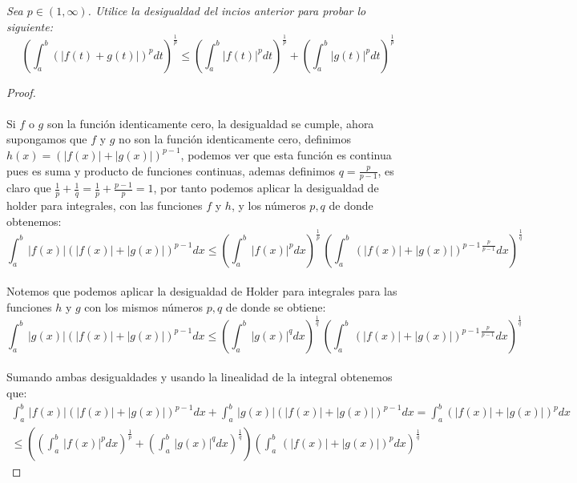 \documentclass[11pt,letterpaper]{article}
\begin{document}
\begin{tcolorbox}[
	title = \textcolor{black}{\textcolor{white}{Problema 2}},]
\textit{Sea $p\in (1,\infty)$. Utilice la desigualdad del incios anterior para probar lo siguiente:\,\\
\begin{equation*}
   \left(\int_{a}^{b}(|f(t)+g(t)|)^pdt\right)^{\frac{1}{p}}\leq\left(\int_{a}^{b}|f(t)|^pdt\right)^{\frac{1}{p}}+\left(\int_{a}^{b}|g(t)|^pdt\right)^{\frac{1}{p}} 
\end{equation*}
}
\end{tcolorbox}
\begin{proof}\,\\
	\,\\
	Si $f$ o $g$ son la funci\'on identicamente cero, la desigualdad se cumple, ahora supongamos que $f$ y $g$ no son la funci\'on identicamente cero, definimos $h(x)=(|f(x)|+|g(x)|)^{p-1}$, podemos ver que esta funci\'on es continua pues es suma y producto de funciones continuas, ademas definimos $q=\frac{p}{p-1}$, es claro que $\frac{1}{p}+\frac{1}{q}=\frac{1}{p}+\frac{p-1}{p}=1$, por tanto podemos aplicar la desigualdad
	de holder para integrales, con las funciones $f$ y $h$, y los n\'umeros $p,q$ de donde obtenemos:\,\\
	\begin{equation*}
		\int_{a}^{b}\,|f(x)|(|f(x)|+|g(x)|)^{p-1}dx\leq \left(\int_{a}^{b}\,|f(x)|^pdx\right)^{\frac{1}{p}}\,\left(\int_{a}^{b}\,(|f(x)|+|g(x)|)^{p-1\,\frac{p}{p-1}}dx\right)^{\frac{1}{q}}
	\end{equation*}\,\\
	Notemos que podemos aplicar la desigualdad de Holder para integrales para las funciones $h$ y $g$ con los mismos n\'umeros $p,q$ de donde se obtiene:\,\\
	\begin{equation*}
		\int_{a}^{b}\,|g(x)|(|f(x)|+|g(x)|)^{p-1}dx\leq \left(\int_{a}^{b}\,|g(x)|^qdx\right)^{\frac{1}{q}}\,\left(\int_{a}^{b}\,(|f(x)|+|g(x)|)^{p-1\,\frac{p}{p-1}}dx\right)^{\frac{1}{q}}
	\end{equation*}\,\\
	Sumando ambas desigualdades y usando la linealidad de la integral obtenemos que:\,\\
	\begin{align*}
		\int_{a}^{b}\,|f(x)|(|f(x)|+|g(x)|)^{p-1}dx+\int_{a}^{b}\,|g(x)|(|f(x)|+|g(x)|)^{p-1}dx=\int_{a}^{b}(|f(x)|+|g(x)|)^pdx\,\\
		\leq\left(\left(\int_{a}^{b}\,|f(x)|^pdx\right)^{\frac{1}{p}}+\left(\int_{a}^{b}\,|g(x)|^qdx\right)^{\frac{1}{q}}\right)\left(\int_{a}^{b}\,(|f(x)|+|g(x)|)^{p}dx\right)^{\frac{1}{q}}

\end{align*}
\end{proof}
\end{document}
